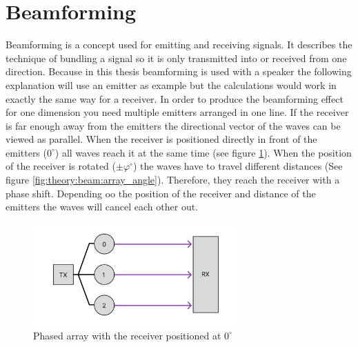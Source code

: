 \section{Beamforming}\label{sec:theory:beam}


Beamforming is a concept used for emitting and receiving signals. It describes the technique of bundling a signal so it is only transmitted into or received from one direction. Because in this thesis beamforming is used with a speaker the following explanation will use an emitter as example but the calculations would work in exactly the same way for a receiver.\cite{van_veen_beamforming_1988}\p
%
In order to produce the beamforming effect for one dimension you need multiple emitters arranged in one line.
If the receiver is far enough away from the emitters the directional vector of the waves can be viewed as parallel. When the receiver is positioned directly in front of the emitters (\(0^\circ\)) all waves reach it at the same time (see figure \ref{fig:theory:beam:array_straight}).
When the position of the receiver is rotated (\(\pm \varphi^\circ\)) the waves have to travel different distances (See figure \ref{fig:theory:beam:array_angle}). Therefore, they reach the receiver with a phase shift. Depending oo the position of the receiver and distance of the emitters the waves will cancel each other out.
%
\begin{figure}
  \centering
  \includegraphics[width=0.7\textwidth]{src/assets/pictures/theory/straight_array.png}
  \caption{Phased array with the receiver positioned at $0^\circ$}\label{fig:theory:beam:array_straight}
\end{figure}
